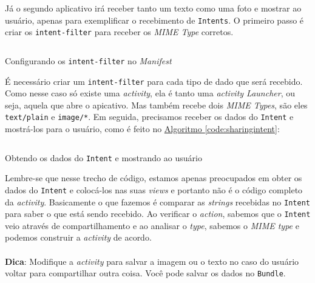 \documentclass[a4paper,12pt,brazil,oneside]{book}
\begin{document}
		Já o segundo aplicativo irá receber tanto um texto como uma foto e mostrar ao usuário, apenas para exemplificar o recebimento de \texttt{Intents}. O primeiro passo é criar os \texttt{intent-filter} para receber os \emph{MIME Type} corretos.

		\begin{listing}[H]
		\inputminted[linenos=true,fontsize=\small,frame=lines, framesep=2mm, tabsize=2,numbersep=5pt]{xml}{src/api/sharing/intentfilter.xml}
		\caption{Configurando os \texttt{intent-filter} no \emph{Manifest}}
		\label{code:intentfilter}
		\end{listing} 	

		É necessário criar um \texttt{intent-filter} para cada tipo de dado que será recebido. Como nesse caso só existe uma \emph{activity}, ela é tanto uma \emph{activity Launcher}, ou seja, aquela que abre o apicativo. Mas também recebe dois \emph{MIME Types}, são eles \texttt{text/plain} e \texttt{image/*}. Em seguida, precisamos receber os dados do \texttt{Intent} e mostrá-los para o usuário, como é feito no \hyperref[code:sharingintent]{Algoritmo \ref*{code:sharingintent}}:

		\begin{listing}[H]
		\inputminted[linenos=true,fontsize=\small,frame=lines, framesep=2mm, tabsize=2,numbersep=5pt]{java}{src/api/sharing/receive.java}
		\caption{Obtendo os dados do \texttt{Intent} e mostrando ao usuário}
		\label{code:sharingintent}
		\end{listing} 		

		Lembre-se que nesse trecho de código, estamos apenas preocupados em obter os dados do \texttt{Intent} e colocá-los nas suas \emph{views} e portanto não é o código completo da \emph{activity}. Basicamente o que fazemos é comparar as \emph{strings} recebidas no \texttt{Intent} para saber o que está sendo recebido. Ao verificar o \emph{action}, sabemos que o \texttt{Intent} veio através de compartilhamento e ao analisar o \emph{type}, sabemos o \emph{MIME type} e podemos construir a \emph{activity} de acordo.

\begin{framed}
\paragraph{}\textbf{Dica}: Modifique a \emph{activity} para salvar a imagem ou o texto no caso do usuário voltar para compartilhar outra coisa. Você pode salvar os dados no \texttt{Bundle}.
\textit{}
\end{framed}
\end{document}
